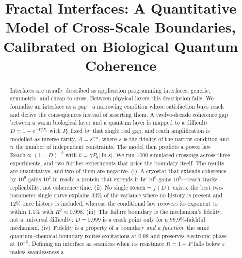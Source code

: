 \documentclass[conference]{IEEEtran}
\theoremstyle{definition}
\begin{document}
\title{Fractal Interfaces: A Quantitative Model of Cross-Scale Boundaries,\\
Calibrated on Biological Quantum Coherence}

\author{
}

\maketitle

\begin{abstract}
Interfaces are usually described as application programming interfaces: generic,
symmetric, and cheap to cross. Between physical layers this description fails. We
formalise an interface as a \emph{gap}---a narrowing condition whose satisfaction
buys reach---and derive the consequences instead of asserting them. A
twelve-decade coherence gap between a warm biological layer and a quantum layer is
mapped to a difficulty $D=1-e^{-P/P_0}$ with $P_0$ fixed by that single real gap,
and reach amplification is modelled as inverse rarity, $A=s^{-n}$, where $s$ is the
fidelity of the narrow condition and $n$ the number of independent constraints.
The model then predicts a power law $\mathrm{Reach}\propto(1-D)^{-k}$ with
$k=\gamma P_0\lvert\ln s\rvert$. We run \num{7000} simulated crossings across three
experiments, and two further experiments that price the boundary itself. The
results are quantitative, and two of them are negative. (i)~A cryostat that extends
coherence by $10^{9}$ gains $10^{2}$ in reach; a protein that extends it by
$10^{0}$ gains $10^{5}$---reach tracks replicability, not coherence time.
(ii)~No single $\mathrm{Reach}=f(D)$ exists: the best two-parameter single curve
explains \num{33}\% of the variance where no history is present and \num{12}\%
once history is included, whereas the conditional law recovers its exponent to
within \num{1.1}\% with $R^2\approx0.998$. (iii)~The failure boundary is the
mechanism's fidelity, not a universal difficulty: $D=0.999$ is a crash point only
for a \num{99.9}\%-faithful mechanism. (iv)~Fidelity is a property of a boundary
\emph{and a function}: the same quantum--chemical boundary routes excitations at
$0.98$ and preserves electronic phase at $10^{-5}$. Defining an interface as
seamless when its resistance $R=1-F$ falls below $\varepsilon$ makes seamlessness a

\end{abstract}
\end{document}
